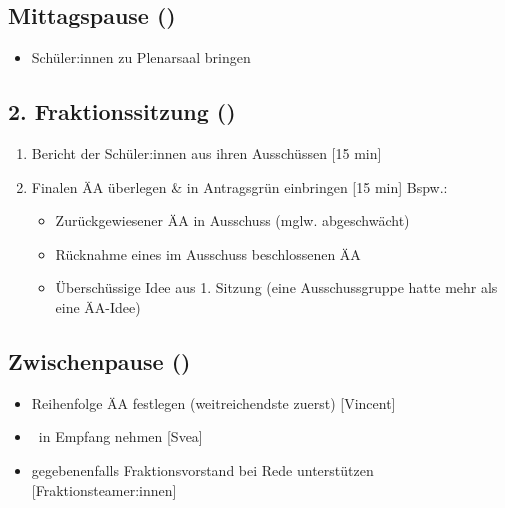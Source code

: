 \documentclass{article}
\newcommand{\KOM}{Svea}
\newcommand{\EP}{Vincent}
\begin{document}
	\subsection{Mittagspause (\timeMittag)}
	\begin{itemize}
		\item Schüler:innen zu Plenarsaal bringen
	\end{itemize}
	
	\subsection{2. Fraktionssitzung (\timeFrakTwo)}
	\begin{enumerate}
		\item Bericht der Schüler:innen aus ihren Ausschüssen [15 min]
		\item Finalen ÄA überlegen \& in Antragsgrün einbringen [15 min] \newline Bspw.:
		\begin{itemize}
			\item Zurückgewiesener ÄA in Ausschuss (mglw. abgeschwächt)
			\item Rücknahme eines im Ausschuss beschlossenen ÄA
			\item Überschüssige Idee aus 1. Sitzung \newline (eine Ausschussgruppe hatte mehr als eine ÄA-Idee)
		\end{itemize}
	\end{enumerate}
	
	\subsection{Zwischenpause (\timePauseTwo)}
	\begin{itemize}
		\item Reihenfolge ÄA festlegen (weitreichendste zuerst) [\EP]
		\item \STADTVERTRETER\ in Empfang nehmen [\KOM]
		\item gegebenenfalls Fraktionsvorstand bei Rede unterstützen [Fraktionsteamer:innen]
	\end{itemize}
	
\end{document}
